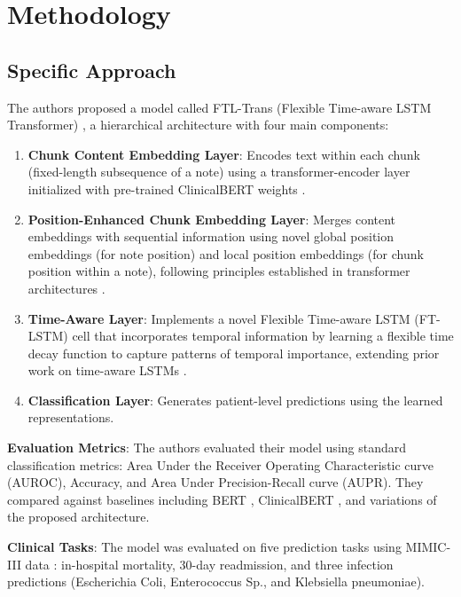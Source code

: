\documentclass[10pt,letterpaper,twocolumn]{article}
\begin{document}
\section{Methodology}

\subsection{Specific Approach}

The authors proposed a model called FTL-Trans (Flexible Time-aware LSTM Transformer) \cite{zhang2020time}, a hierarchical architecture with four main components:

\begin{enumerate}[leftmargin=*]
    \item \textbf{Chunk Content Embedding Layer}: Encodes text within each chunk (fixed-length subsequence of a note) using a transformer-encoder layer initialized with pre-trained ClinicalBERT weights \cite{huang2019clinicalbert}.
    
    \item \textbf{Position-Enhanced Chunk Embedding Layer}: Merges content embeddings with sequential information using novel global position embeddings (for note position) and local position embeddings (for chunk position within a note), following principles established in transformer architectures \cite{vaswani2017attention}.
    
    \item \textbf{Time-Aware Layer}: Implements a novel Flexible Time-aware LSTM (FT-LSTM) cell that incorporates temporal information by learning a flexible time decay function to capture patterns of temporal importance, extending prior work on time-aware LSTMs \cite{baytas2017patient}.
    
    \item \textbf{Classification Layer}: Generates patient-level predictions using the learned representations.
\end{enumerate}

\textbf{Evaluation Metrics}: The authors evaluated their model using standard classification metrics: Area Under the Receiver Operating Characteristic curve (AUROC), Accuracy, and Area Under Precision-Recall curve (AUPR). They compared against baselines including BERT \cite{devlin2018bert}, ClinicalBERT \cite{huang2019clinicalbert}, and variations of the proposed architecture.

\textbf{Clinical Tasks}: The model was evaluated on five prediction tasks using MIMIC-III data \cite{johnson2016mimic}: in-hospital mortality, 30-day readmission, and three infection predictions (Escherichia Coli, Enterococcus Sp., and Klebsiella pneumoniae).
\end{document}
